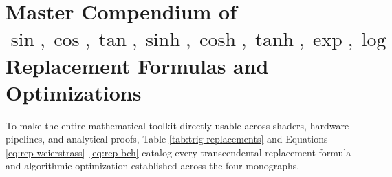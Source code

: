 \documentclass[11pt, a4paper]{article}
\begin{document}
\section{Master Compendium of \texorpdfstring{$\sin, \cos, \tan, \sinh, \cosh, \tanh, \exp, \log$}{sin, cos, tan, sinh, cosh, tanh, exp, log} Replacement Formulas and Optimizations}

To make the entire mathematical toolkit directly usable across shaders, hardware pipelines, and analytical proofs, Table \ref{tab:trig-replacements} and Equations \eqref{eq:rep-weierstrass}--\eqref{eq:rep-bch} catalog every transcendental replacement formula and algorithmic optimization established across the four monographs.
\end{document}
